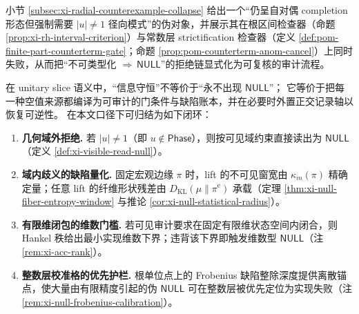 \begin{remark}\label{rem:xi-radial-collapse-template}
小节 \ref{subsec:xi-radial-counterexample-collapse} 给出一个“仍呈自对偶 completion 形态但强制需要 \(|u|\neq 1\) 径向模式”的伪对象，并展示其在根区间检查器（命题 \ref{prop:xi-rh-interval-criterion}）与常数层 strictification 检查器（定义 \ref{def:pom-finite-part-counterterm-gate}；命题 \ref{prop:pom-counterterm-anom-cancel}）上同时失败，从而把“不可类型化 \(\Rightarrow\ \mathsf{NULL}\)”的拒绝链显式化为可复核的审计流程。
\end{remark}

\begin{remark}\label{rem:xi-null-conservation-closure}
在 unitary slice 语义中，“信息守恒”不等价于“永不出现 \(\mathsf{NULL}\)”；
它等价于把每一种空值来源都编译为可审计的门条件与缺陷账本，并在必要时外置正交记录轴以恢复可逆性。
在本文口径下可归结为如下闭环：
\begin{enumerate}
  \item \textbf{几何域外拒绝.} 若 \(|u|\neq 1\)（即 \(u\notin\mathsf{Phase}\)），则按可见域约束直接读出为 \(\mathsf{NULL}\)（定义 \ref{def:xi-visible-read-null}）。
  \item \textbf{域内歧义的缺陷量化.} 固定宏观边缘 \(\pi\) 时，lift 的不可见窗宽由 \(\kappa_m(\pi)\) 精确定量；任意 lift 的纤维形状残差由 \(D_{\mathrm{KL}}(\mu\|\pi^{\mathrm{e}})\) 承载（定理 \ref{thm:xi-null-fiber-entropy-window} 与推论 \ref{cor:xi-null-statistical-radius}）。
  \item \textbf{有限维闭包的维数门槛.} 若可见审计要求在固定有限维状态空间内闭合，则 Hankel 秩给出最小实现维数下界；违背该下界即触发维数型 \(\mathsf{NULL}\)（注 \ref{rem:xi-acc-rank}）。
  \item \textbf{整数层校准格的优先护栏.} 根单位点上的 Frobenius 缺陷整除深度提供离散锚点，使大量由有限精度引起的伪 \(\mathsf{NULL}\) 可在整数层被优先定位为实现失败（注 \ref{rem:xi-null-frobenius-calibration}）。
\end{enumerate}
\end{remark}

